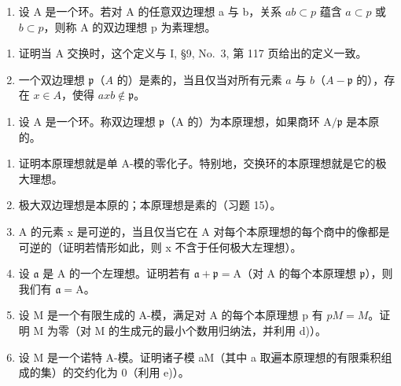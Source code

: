 \begin{enumerate}
\def\labelenumi{\arabic{enumi})}
\setcounter{enumi}{14}
\tightlist
\item
  设 A 是一个环。若对 A 的任意双边理想 a 与 b，关系 \(ab \subset p\) 蕴含 \(a \subset p\) 或 \(b \subset p\)，则称 A 的双边理想 p 为素理想。
\end{enumerate}

\begin{enumerate}
\def\labelenumi{\alph{enumi})}
\item
  证明当 A 交换时，这个定义与 I, §9, No.~3, 第 117 页给出的定义一致。
\item
  一个双边理想 \(\mathfrak{p}\)（\(A\) 的）是素的，当且仅当对所有元素 \(a\) 与 \(b\)（\(A - \mathfrak{p}\) 的），存在 \(x \in A\)，使得 \(axb \notin \mathfrak{p}\)。
\end{enumerate}

\begin{enumerate}
\def\labelenumi{\arabic{enumi})}
\setcounter{enumi}{15}
\tightlist
\item
  设 \(\mathrm{A}\) 是一个环。称双边理想 \(\mathfrak{p}\)（\(\mathrm{A}\) 的）为本原理想，如果商环 \(\mathrm{A} / \mathfrak{p}\) 是本原的。
\end{enumerate}

\begin{enumerate}
\def\labelenumi{\alph{enumi})}
\item
  证明本原理想就是单 A-模的零化子。特别地，交换环的本原理想就是它的极大理想。
\item
  极大双边理想是本原的；本原理想是素的（习题 15）。
\item
  A 的元素 x 是可逆的，当且仅当它在 A 对每个本原理想的每个商中的像都是可逆的（证明若情形如此，则 x 不含于任何极大左理想）。
\item
  设 \(\mathfrak{a}\) 是 A 的一个左理想。证明若有 \(\mathfrak{a} + \mathfrak{p} = \mathrm{A}\)（对 A 的每个本原理想 \(\mathfrak{p}\)），则我们有 \(\mathfrak{a} = \mathrm{A}\)。
\item
  设 M 是一个有限生成的 A-模，满足对 A 的每个本原理想 p 有 \(pM = M\)。证明 M 为零（对 M 的生成元的最小个数用归纳法，并利用 d)）。
\item
  设 M 是一个诺特 A-模。证明诸子模 aM（其中 a 取遍本原理想的有限乘积组成的集）的交约化为 0（利用 e)）。
\end{enumerate}

